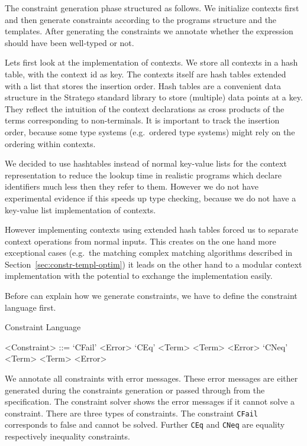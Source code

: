 The constraint generation phase structured as follows. We initialize
contexts first and then generate constraints according to the programs
structure and the templates. After generating the constraints we
annotate whether the expression should have been well-typed or not.

Lets first look at the implementation of contexts. We store all
contexts in a hash table, with the context id as key. The contexts
itself are hash tables extended with a list that stores the insertion
order. Hash tables are a convenient data structure in the Stratego
standard library to store (multiple) data points at a key. They
reflect the intuition of the context declarations as cross products of
the terms corresponding to non-terminals. It is important to track the
insertion order, because some type systems (e.g.\ ordered type
systems) might rely on the ordering within contexts.

We decided to use hashtables instead of normal key-value lists for the
context representation to reduce the lookup time in realistic programs
which declare identifiers much less then they refer to them. However
we do not have experimental evidence if this speeds up type checking,
because we do not have a key-value list implementation of contexts.

However implementing contexts using extended hash tables forced us to
separate context operations from normal inputs. This creates on the
one hand more exceptional cases (e.g.\ the matching complex matching
algorithms described in Section~\ref{sec:constr-templ-optim}) it leads
on the other hand to a modular context implementation with the
potential to exchange the implementation easily.

Before can explain how we generate constraints, we have to define the
constraint language first.

\begin{definition}{Constraint Language}
  \begin{grammar}
    <Constraint> ::= `CFail' <Error>
    \alt `CEq' <Term> <Term> <Error>
    \alt `CNeq' <Term> <Term> <Error>
  \end{grammar}
\end{definition}

We annotate all constraints with error messages. These error messages
are either generated during the constraints generation or passed
through from the specification. The constraint solver shows the error
messages if it cannot solve a constraint. There are three types of
constraints. The constraint \verb|CFail| corresponds to false and
cannot be solved. Further \verb|CEq| and \verb|CNeq| are equality
respectively inequality constraints.

